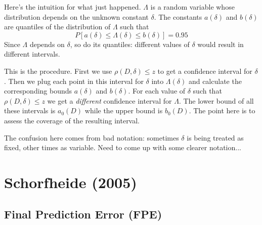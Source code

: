 \documentclass[12pt]{article}
\theoremstyle{definition}
\begin{document}
Here's the intuition for what just happened. $\Lambda$ is a random variable whose distribution depends on the unknown constant $\delta$. The constants $a(\delta)$ and $b(\delta)$ are quantiles of the distribution of $\Lambda$ such that 
	$$P\left[a(\delta) \leq \Lambda(\delta) \leq b(\delta)\right] = 0.95$$
Since $\Lambda$ depends on $\delta$, so do its quantiles: different values of $\delta$ would result in different intervals. 

This is the procedure. First we use $\rho(D,\delta)\leq z$ to get a confidence interval for $\delta$. Then we plug each point in this interval for $\delta$ into $\Lambda(\delta)$ and calculate the corresponding bounds $a(\delta)$ and $b(\delta)$. For each value of $\delta$ such that $\rho(D,\delta)\leq z$ we get a \emph{different} confidence interval for $\Lambda$. The lower bound of all these intervals is $a_0(D)$ while the upper bound is $b_0(D)$. The point here is to assess the coverage of the resulting interval.

The confusion here comes from bad notation: sometimes $\delta$ is being treated as fixed, other times as variable. Need to come up with some clearer notation...















\section{Schorfheide (2005)}
\subsection{Final Prediction Error (FPE)}
\end{document}
